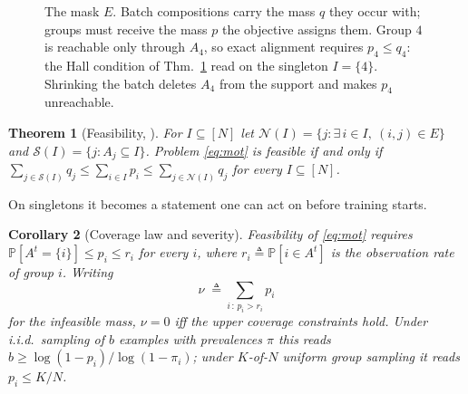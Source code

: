 \documentclass{article}
\newtheorem{theorem}{Theorem}
\newtheorem{corollary}[theorem]{Corollary}
\theoremstyle{definition}
\newcommand{\PP}{\mathbb{P}}
\newcommand{\Nn}[1]{[#1]}
\begin{document}
\begin{figure}[t]
\centering
{}
\caption{The mask $E$. Batch compositions carry the mass $q$ they occur with;
groups must receive the mass $p$ the objective assigns them. Group $4$ is
reachable only through $A_4$, so exact alignment requires $p_4\le q_4$: the
Hall condition of Thm.~\ref{thm:feas} read on the singleton $I=\{4\}$. Shrinking
the batch deletes $A_4$ from the support and makes $p_4$ unreachable.}
\label{fig:mask}
\end{figure}

\begin{theorem}[Feasibility, {\cite[Thm.~1]{rahimi2025fedavot}}]
\label{thm:feas}
For $I\subseteq\Nn{N}$ let $\mathcal{N}(I)=\{j:\exists\,i\in I,\ (i,j)\in E\}$
and $\mathcal{S}(I)=\{j: A_j\subseteq I\}$. Problem \eqref{eq:mot} is feasible
if and only if
$\sum_{j\in\mathcal{S}(I)}q_j\le\sum_{i\in I}p_i\le\sum_{j\in\mathcal{N}(I)}q_j$
for every $I\subseteq\Nn{N}$.
\end{theorem}

On singletons it becomes a statement one can act on before training starts.

\begin{corollary}[Coverage law and severity]
\label{cor:batchsize}
Feasibility of \eqref{eq:mot} requires $\PP[A^t=\{i\}]\le p_i\le r_i$ for every
$i$, where $r_i\triangleq\PP[i\in A^t]$ is the observation rate of group $i$.
Writing
\begin{equation}
\nu\;\triangleq\!\!\sum_{i\,:\,p_i>r_i}\!\! p_i
\label{eq:batchlaw}
\end{equation}
for the \emph{infeasible mass}, $\nu=0$ iff the upper coverage constraints hold.
Under i.i.d.\ sampling of $b$ examples with prevalences $\pi$ this reads
$b\ge\log(1-p_i)/\log(1-\pi_i)$; under $K$-of-$N$ uniform group sampling it
reads $p_i\le K/N$.
\end{corollary}
\end{document}
